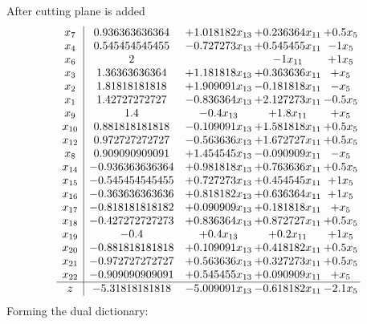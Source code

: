\documentclass[11pt]{article}
\begin{document}
 After cutting plane is added 
\[\begin{array}{c| c c@{\hskip 2pt} c@{\hskip 2pt} c@{\hskip 2pt} }
 x_{7}   &  0.936363636364 & + 1.018182 x_{13} & + 0.236364 x_{11} & + 0.5 x_{5}\\
 x_{4}   &  0.545454545455 & -0.727273 x_{13} & + 0.545455 x_{11} & -1 x_{5}\\
 x_{6}   &  2  &   & -1 x_{11} & + 1 x_{5}\\
 x_{3}   &  1.36363636364 & + 1.181818 x_{13} & + 0.363636 x_{11} & +  x_{5}\\
 x_{2}   &  1.81818181818 & + 1.909091 x_{13} & -0.181818 x_{11} & - x_{5}\\
 x_{1}   &  1.42727272727 & -0.836364 x_{13} & + 2.127273 x_{11} & -0.5 x_{5}\\
 x_{9}   &  1.4 & -0.4 x_{13} & + 1.8 x_{11} & +  x_{5}\\
 x_{10}   &  0.881818181818 & -0.109091 x_{13} & + 1.581818 x_{11} & + 0.5 x_{5}\\
 x_{12}   &  0.972727272727 & -0.563636 x_{13} & + 1.672727 x_{11} & + 0.5 x_{5}\\
 x_{8}   &  0.909090909091 & + 1.454545 x_{13} & -0.090909 x_{11} & - x_{5}\\
 x_{14}   &  -0.936363636364 & + 0.981818 x_{13} & + 0.763636 x_{11} & + 0.5 x_{5}\\
 x_{15}   &  -0.545454545455 & + 0.727273 x_{13} & + 0.454545 x_{11} & + 1 x_{5}\\
 x_{16}   &  -0.363636363636 & + 0.818182 x_{13} & + 0.636364 x_{11} & + 1 x_{5}\\
 x_{17}   &  -0.818181818182 & + 0.090909 x_{13} & + 0.181818 x_{11} & +  x_{5}\\
 x_{18}   &  -0.427272727273 & + 0.836364 x_{13} & + 0.872727 x_{11} & + 0.5 x_{5}\\
 x_{19}   &  -0.4 & + 0.4 x_{13} & + 0.2 x_{11} & + 1 x_{5}\\
 x_{20}   &  -0.881818181818 & + 0.109091 x_{13} & + 0.418182 x_{11} & + 0.5 x_{5}\\
 x_{21}   &  -0.972727272727 & + 0.563636 x_{13} & + 0.327273 x_{11} & + 0.5 x_{5}\\
 x_{22}   &  -0.909090909091 & + 0.545455 x_{13} & + 0.090909 x_{11} & +  x_{5}\\
\hline
z    &  -5.31818181818 & -5.009091 x_{13} & -0.618182 x_{11} & -2.1 x_{5}\\
\end{array}\]
Forming the dual dictionary:
\end{document}
